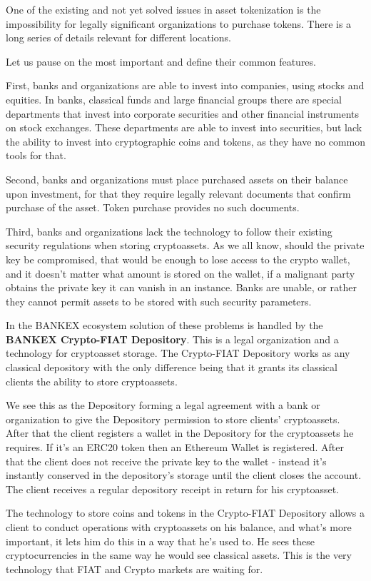 \documentclass{article}
\begin{document}
\begin{multicols}{2}
One of the existing and not yet solved issues in asset tokenization is the impossibility for legally significant organizations to purchase tokens. There is a long series of details relevant for different locations.

Let us pause on the most important and define their common features.

First, banks and organizations are able to invest into companies, using stocks and equities. In banks, classical funds and large financial groups there are special departments that invest into corporate securities and other financial instruments on stock exchanges. These departments are able to invest into securities, but lack the ability to invest into cryptographic coins and tokens, as they have no common tools for that.

Second, banks and organizations must place purchased assets on their balance upon investment, for that they require legally relevant documents that confirm purchase of the asset. Token purchase provides no such documents. 

Third, banks and organizations lack the technology to follow their existing security regulations when storing cryptoassets. As we all know, should the private key be compromised, that would be enough to lose access to the crypto wallet, and it doesn’t matter what amount is stored on the wallet, if a malignant party obtains the private key it can vanish in an instance. Banks are unable, or rather they cannot permit assets to be stored with such security parameters. 

In the BANKEX ecosystem solution of these problems is handled by the \textbf{BANKEX Crypto-FIAT Depository}. This is a legal organization and a technology for cryptoasset storage. The Crypto-FIAT Depository works as any classical depository with the only difference being that it grants its classical clients the ability to store cryptoassets.

We see this as the Depository forming a legal agreement with a bank or organization to give the Depository permission to store clients’ cryptoassets. After that the client registers a wallet in the Depository for the cryptoassets he requires. If it’s an ERC20 token then an Ethereum Wallet is registered. After that the client does not receive the private key to the wallet - instead it’s instantly conserved in the depository’s storage until the client closes the account. The client receives a regular depository receipt in return for his cryptoasset.

The technology to store coins and tokens in the Crypto-FIAT Depository allows a client to conduct operations with cryptoassets on his balance, and what’s more important, it lets him do this in a way that he’s used to. He sees these cryptocurrencies in the same way he would see classical assets. This is the very technology that FIAT and Crypto markets are waiting for.


\end{multicols}
\end{document}
